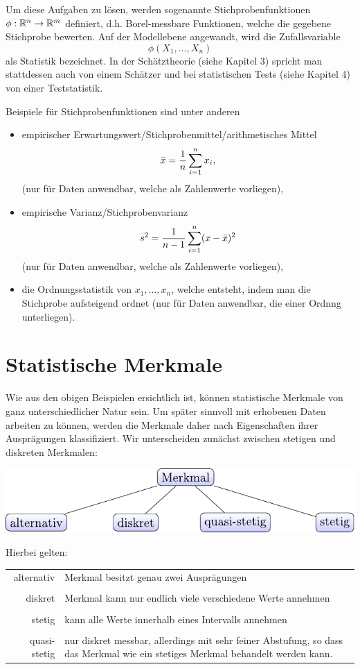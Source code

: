 Um diese Aufgaben zu lösen, werden sogenannte Stichprobenfunktionen $\phi :
\mathbb{R}^n \to \mathbb{R}^m$ definiert, d.h. Borel-messbare Funktionen, welche die
gegebene Stichprobe bewerten. Auf der Modellebene angewandt, wird die
Zufallsvariable
\[ \phi(X_1, \ldots, X_n) \]
als Statistik bezeichnet. In der Schätztheorie (siehe Kapitel 3) spricht man
stattdessen auch von einem Schätzer und bei statistischen Tests (siehe Kapitel
4) von einer Teststatistik.

Beispiele für Stichprobenfunktionen sind unter anderen
\begin{itemize}
\item empirischer Erwartungswert/Stichprobenmittel/arithmetisches Mittel
  \[ \obar{x} = \rez{n} \sum_{i=1}^n x_i, \]
  (nur für Daten anwendbar, welche als Zahlenwerte vorliegen),
\item empirische Varianz/Stichprobenvarianz
  \[s^2 = \frac{1}{n-1} \sum_{i=1}^n (x - \bar{x})^2 \]
  (nur für Daten anwendbar, welche als Zahlenwerte vorliegen),
\item die Ordnungsstatistik von $x_1, \ldots, x_n$, welche entsteht, indem man
  die Stichprobe aufsteigend ordnet (nur für Daten anwendbar, die einer Ordnng
  unterliegen).
\end{itemize}

\section{Statistische Merkmale}
Wie aus den obigen Beispielen ersichtlich ist, können statistische Merkmale von
ganz unterschiedlicher Natur sein. Um später sinnvoll mit erhobenen Daten
arbeiten zu können, werden die Merkmale daher nach Eigenschaften ihrer
Ausprägungen klassifiziert. Wir unterscheiden zunächst zwischen stetigen und
diskreten Merkmalen:

\begin{center}
  \includegraphics{img/merkmale_stetig_diskret}
\end{center}

Hierbei gelten:
\begin{center}
  \begin{tabular}{r|p{12cm}}
    alternativ & Merkmal besitzt genau zwei Ausprägungen \\
    \\
    diskret & Merkmal kann nur endlich viele verschiedene Werte annehmen \\
    \\
    stetig & kann alle Werte innerhalb eines Intervalls annehmen \\
    \\
    quasi-stetig & nur diskret messbar, allerdings mit sehr feiner Abstufung,
                   so dass das Merkmal wie ein stetiges Merkmal behandelt
                   werden kann.
  \end{tabular}
\end{center}

